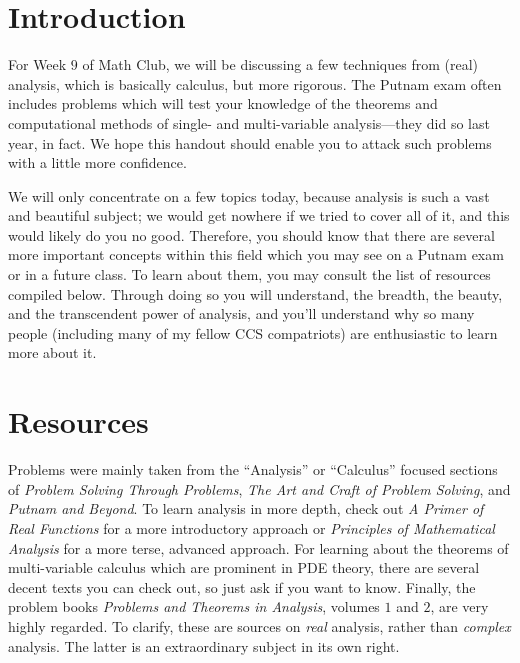 \documentclass{article}
\theoremstyle{definition}
\theoremstyle{remark}
\begin{document}
\section{Introduction}
For Week $9$ of Math Club, we will be discussing a few techniques from (real) analysis, which is basically calculus, but more rigorous. The Putnam exam often includes problems which will test your knowledge of the theorems and computational methods of single- and multi-variable analysis---they did so last year, in fact. We hope this handout should enable you to attack such problems with a little more confidence.

We will only concentrate on a few topics today, because analysis is such a vast and beautiful subject; we would get nowhere if we tried to cover all of it, and this would likely do you no good. Therefore, you should know that there are several more important concepts within this field which you may see on a Putnam exam or in a future class. To learn about them, you may consult the list of resources compiled below. Through doing so you will understand, the breadth, the beauty, and the transcendent power of analysis, and you'll understand why so many people (including many of my fellow CCS compatriots) are enthusiastic to learn more about it.

\section{Resources}
Problems were mainly taken from the ``Analysis'' or ``Calculus'' focused sections of \emph{Problem Solving Through Problems}, \emph{The Art and Craft of Problem Solving}, and \emph{Putnam and Beyond}. To learn analysis in more depth, check out \emph{A Primer of Real Functions} for a more introductory approach or \emph{Principles of Mathematical Analysis} for a more terse, advanced approach. For learning about the theorems of multi-variable calculus which are prominent in PDE theory, there are several decent texts you can check out, so just ask if you want to know. Finally, the problem books \emph{Problems and Theorems in Analysis}, volumes $1$ and $2$, are very highly regarded. To clarify, these are sources on \emph{real} analysis, rather than \emph{complex} analysis. The latter is an extraordinary subject in its own right.
\end{document}
